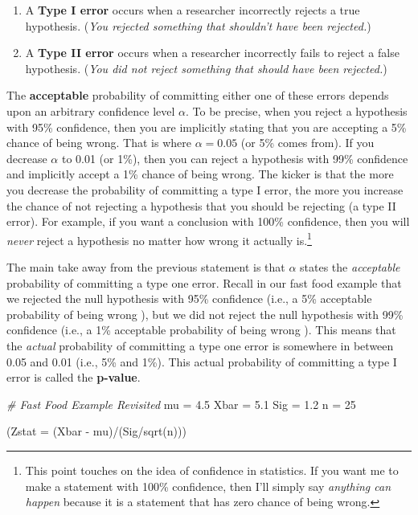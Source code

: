 \documentclass[
]{book}
\newenvironment{Shaded}{\begin{snugshade}}{\end{snugshade}}
\newcommand{\AttributeTok}[1]{\textcolor[rgb]{0.77,0.63,0.00}{#1}}
\newcommand{\CommentTok}[1]{\textcolor[rgb]{0.56,0.35,0.01}{\textit{#1}}}
\newcommand{\DecValTok}[1]{\textcolor[rgb]{0.00,0.00,0.81}{#1}}
\newcommand{\FloatTok}[1]{\textcolor[rgb]{0.00,0.00,0.81}{#1}}
\newcommand{\FunctionTok}[1]{\textcolor[rgb]{0.00,0.00,0.00}{#1}}
\newcommand{\NormalTok}[1]{#1}
\newcommand{\OtherTok}[1]{\textcolor[rgb]{0.56,0.35,0.01}{#1}}
\newcommand{\SpecialCharTok}[1]{\textcolor[rgb]{0.00,0.00,0.00}{#1}}
\begin{document}
\begin{enumerate}
\def\labelenumi{\arabic{enumi}.}
\item
  A \textbf{Type I error} occurs when a researcher incorrectly rejects a true hypothesis. (\emph{You rejected something that shouldn't have been rejected.})
\item
  A \textbf{Type II error} occurs when a researcher incorrectly fails to reject a false hypothesis. (\emph{You did not reject something that should have been rejected.})
\end{enumerate}

The \textbf{acceptable} probability of committing either one of these errors depends upon an arbitrary confidence level \(\alpha\). To be precise, when you reject a hypothesis with 95\% confidence, then you are implicitly stating that you are accepting a 5\% chance of being wrong. That is where \(\alpha=0.05\) (or 5\% comes from). If you decrease \(\alpha\) to 0.01 (or 1\%), then you can reject a hypothesis with 99\% confidence and implicitly accept a 1\% chance of being wrong. The kicker is that the more you decrease the probability of committing a type I error, the more you increase the chance of not rejecting a hypothesis that you should be rejecting (a type II error). For example, if you want a conclusion with 100\% confidence, then you will \emph{never} reject a hypothesis no matter how wrong it actually is.\footnote{This point touches on the idea of confidence in statistics. If you want me to make a statement with 100\% confidence, then I'll simply say \emph{anything can happen} because it is a statement that has zero chance of being wrong.}

The main take away from the previous statement is that \(\alpha\) states the \emph{acceptable} probability of committing a type one error. Recall in our fast food example that we rejected the null hypothesis with 95\% confidence (i.e., a 5\% acceptable probability of being wrong ), but we did not reject the null hypothesis with 99\% confidence (i.e., a 1\% acceptable probability of being wrong ). This means that the \emph{actual} probability of committing a type one error is somewhere in between 0.05 and 0.01 (i.e., 5\% and 1\%). This actual probability of committing a type I error is called the \textbf{p-value}.

\begin{Shaded}
\begin{Highlighting}[]
\CommentTok{\# Fast Food Example Revisited}
\NormalTok{mu }\OtherTok{=} \FloatTok{4.5}
\NormalTok{Xbar }\OtherTok{=} \FloatTok{5.1}
\NormalTok{Sig }\OtherTok{=} \FloatTok{1.2}
\NormalTok{n }\OtherTok{=} \DecValTok{25}

\NormalTok{(}\AttributeTok{Zstat =}\NormalTok{ (Xbar }\SpecialCharTok{{-}}\NormalTok{ mu)}\SpecialCharTok{/}\NormalTok{(Sig}\SpecialCharTok{/}\FunctionTok{sqrt}\NormalTok{(n)))}
\end{Highlighting}
\end{Shaded}
\end{document}
